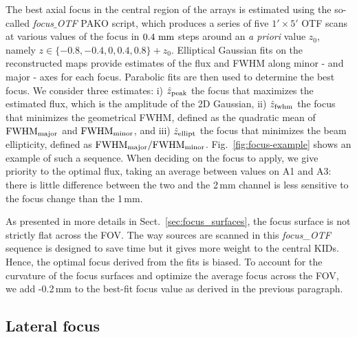 The best axial focus in the central region of the arrays is estimated using the
so-called \emph{focus$\_$OTF} PAKO script, which produces a series of five $1'
\times 5'$ OTF scans at various values of the focus in $0.4~\rm{mm}$ steps
around an \emph{a priori} value $z_0$, namely
$z \in \{-0.8, -0.4, 0, 0.4, 0.8\} + z_0$.
Elliptical Gaussian fits on the reconstructed maps provide estimates of
the flux and FWHM along minor - and major - axes for each focus. Parabolic fits are
then used to determine the best focus. We consider three estimates: i) $\hat
z_{\rm{peak}}$ the focus that maximizes the estimated flux, which is the
amplitude of the 2D Gaussian, ii) $\hat z_{\rm{fwhm}}$ the focus that minimizes
the geometrical FWHM, defined as the quadratic mean of $\rm{FWHM}_{\rm{major}}$
and $\rm{FWHM}_{\rm{minor}}$, and iii) $\hat z_{\rm{ellipt}}$ the focus that
minimizes the beam ellipticity, defined as
$\rm{FWHM}_{\rm{major}}/\rm{FWHM}_{\rm{minor}}$. Fig.~\ref{fig:focus-example}
shows an example of such a sequence. When deciding on the focus to apply, we
give priority to the optimal flux, taking an average between values on A1 and
A3: there is little difference between the two and the 2\,mm channel is
less sensitive to the focus change than the 1\,mm.

As presented in more details in Sect.~\ref{sec:focus_surfaces}, the focus
surface is not strictly flat across the FOV. The way sources are scanned in
this \emph{focus\_OTF} sequence is designed to save time but it gives more weight
to the central KIDs. Hence, the optimal focus derived from the fits is
biased. To account for the curvature of the focus surfaces and optimize the
average focus across the FOV, we add -0.2\,mm to the best-fit focus value as derived
in the previous paragraph. 

\subsection{Lateral focus}
\label{sec:focus_X_Y}

